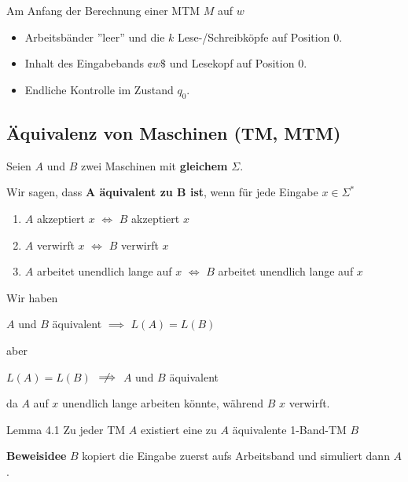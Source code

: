 \documentclass[a4paper, 11pt]{article}
\begin{document}
        Am Anfang der Berechnung einer MTM $M$ auf $w$
        \begin{itemize}[label=-]
            \item Arbeitsbänder ''leer'' und die $k$ Lese-/Schreibköpfe auf Position $0$.
            \item Inhalt des Eingabebands $\cent w \$$ und Lesekopf auf Position $0$.
            \item Endliche Kontrolle im Zustand $q_0$.
        \end{itemize}
    
    
    
        \subsection{Äquivalenz von Maschinen (TM, MTM)}
        \begin{mainbox}{}
            Seien $A$ und $B$ zwei Maschinen mit \textbf{gleichem} $\Sigma$.
    
            Wir sagen, dass \textbf{$\mathbf{A}$ äquivalent zu $\mathbf{B}$ ist}, wenn für jede Eingabe $x \in \Sigma^*$
            \begin{enumerate}[label=(\roman*)]
                \item $A$ akzeptiert $x$ $\iff$ $B$ akzeptiert $x$
                \item $A$ verwirft $x$ $\iff$ $B$ verwirft $x$
                \item $A$ arbeitet unendlich lange auf $x$ $\iff$ $B$ arbeitet unendlich lange auf $x$
            \end{enumerate}
        \end{mainbox}
        Wir haben 
        \begin{center}
            $A$ und $B$ äquivalent $\implies$ $L(A) = L(B)$
    
            aber 
    
            $L(A) = L(B)$ $\centernot{\implies}$ $A$ und $B$ äquivalent
        \end{center}
        da $A$ auf $x$ unendlich lange arbeiten könnte, während $B$ $x$ verwirft.
    
        \begin{mainbox}{Lemma 4.1}
            Zu jeder TM $A$ existiert eine zu $A$ äquivalente 1-Band-TM $B$
        \end{mainbox}
        \textbf{Beweisidee}
        $B$ kopiert die Eingabe zuerst aufs Arbeitsband und simuliert dann $A$.
    
\end{document}
